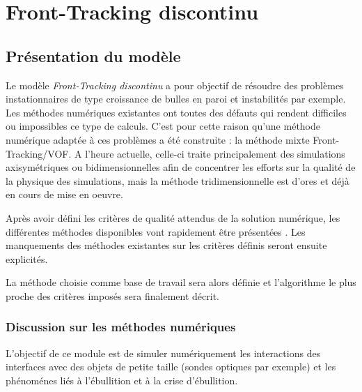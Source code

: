 \newpage


\chapter{Front-Tracking discontinu}
\label{sec:FTD}

\section{Pr\'esentation du mod\`ele}

Le mod\`ele \textit{Front-Tracking discontinu} a pour objectif de r\'esoudre des probl\`emes instationnaires
de type croissance de bulles en paroi et instabilit\'es par exemple.
Les m\'ethodes num\'eriques existantes ont toutes des d\'efauts qui rendent difficiles ou impossibles
ce type de calculs.
C'est pour cette raison qu'une m\'ethode num\'erique adapt\'ee \`a ces probl\`emes a \'et\'e construite :
la m\'ethode mixte Front-Tracking/VOF.
A l'heure actuelle, celle-ci traite principalement des simulations axisym\'etriques ou bidimensionnelles
afin de concentrer les efforts sur la qualit\'e de la physique des simulations,
mais la m\'ethode tridimensionnelle est d'ores et d\'ej\`a en cours de mise en oeuvre.

Apr\`es avoir d\'efini les crit\`eres de qualit\'e attendus de la solution num\'erique,
les diff\'erentes m\'ethodes disponibles vont rapidement \^etre pr\'esent\'ees .
Les manquements des m\'ethodes existantes sur les crit\`eres d\'efinis seront ensuite explicit\'es.

La m\'ethode choisie comme base de travail sera alors d\'efinie et l'algorithme le plus proche
des crit\`eres impos\'es sera finalement d\'ecrit.


\subsection{Discussion sur les m\'ethodes num\'eriques}

L'objectif de ce module est de simuler num\'eriquement les interactions des interfaces
avec des objets de petite taille (sondes optiques par exemple)
et les ph\'enom\'enes li\'es à l'\'ebullition et \`a la crise d'\'ebullition.

